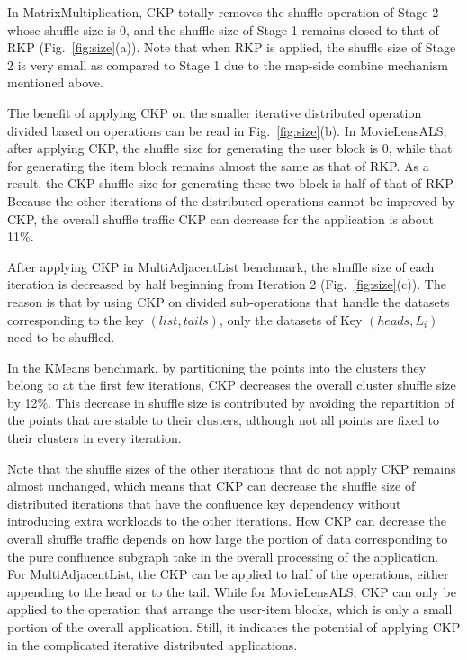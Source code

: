 \documentclass[10pt,journal,compsoc]{IEEEtran}
\begin{document}
In MatrixMultiplication, CKP totally removes the shuffle operation of Stage 2 whose shuffle size is 0, and the shuffle size of Stage 1 remains closed to that of RKP (Fig.~\ref{fig:size}(a)). 
Note that when RKP is applied, the shuffle size of Stage 2 is very small as compared to Stage 1 due to the map-side combine mechanism mentioned above.


The benefit of applying CKP on the smaller iterative distributed operation divided based on operations can be read in Fig.~\ref{fig:size}(b).
In MovieLensALS, after applying CKP, the shuffle size for generating the user block is 0, while that for generating the item block remains almost the same as that of RKP. 
As a result, the CKP shuffle size for generating these two block is half of that of RKP. 
Because the other iterations of the distributed operations cannot be improved by CKP, 
the overall shuffle traffic CKP can decrease for the application is about 11\%.

After applying CKP in MultiAdjacentList benchmark, the shuffle size of each iteration is decreased by half beginning from Iteration 2 (Fig.~\ref{fig:size}(c)). 
The reason is that by using CKP on divided sub-operations that handle the datasets corresponding to the key $(list, tails)$, only the datasets of Key  $(heads, L_i)$ need to be shuffled.

In the KMeans benchmark, by partitioning the points into the clusters they belong to at the first few iterations, CKP decreases the overall cluster shuffle size by 12\%. 
This decrease in shuffle size is contributed by avoiding the repartition of the points that are stable to their clusters,
although not all points are fixed to their clusters in every iteration. 

Note that the shuffle sizes of the other iterations that do not apply CKP remains almost unchanged, which means that CKP can decrease the shuffle size of distributed iterations that have the confluence key dependency without introducing extra workloads to the other iterations. 
How CKP can decrease the overall shuffle traffic depends on how large the portion of data corresponding to the pure confluence subgraph take in the overall processing of the application. 
For MultiAdjacentList, the CKP can be applied to half of the operations, either appending to the head or to the tail.
While for MovieLensALS, CKP can only be applied to the operation that arrange the user-item blocks, which is only a small portion of the overall application. 
Still, it indicates the potential of applying CKP in the complicated iterative distributed applications. 
\end{document}
